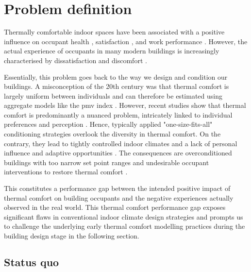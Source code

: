 
\section{Problem definition}
\label{sec:jp-iii-problem-definition}

Thermally comfortable indoor spaces have been associated with a positive influence on occupant health \citep{Altomonte2020}, satisfaction \citep{Frontczak2011, Wagner2007}, and work performance \citep{Wyon2013, Tanabe2015, Porras-Salazar2021}. However, the actual experience of occupants in many modern buildings is increasingly characterised by dissatisfaction and discomfort \citep{Graham2021}. 

Essentially, this problem goes back to the way we design and condition our buildings. A misconception of the 20th century was that thermal comfort is largely uniform between individuals and can therefore be estimated using aggregate models like the \gls{pmv} index \citep{Fanger1972}. However, recent studies show that thermal comfort is predominantly a nuanced problem, intricately linked to individual preferences and perception \citep{KramerFieldstudy2023, Gauthier2020}. Hence, typically applied "one-size-fits-all" conditioning strategies overlook the diversity in thermal comfort. On the contrary, they lead to tightly controlled indoor climates and a lack of personal influence and adaptive opportunities \citep{Humphreys1978, Aguilera2019}. The consequences are overconditioned buildings \citep{Park2018, Parkinson2021, Fukawa2021} with too narrow set point ranges \citep{Hoyt2015, Li2019, Arens2010} and undesirable occupant interventions to restore thermal comfort \citep{Hong2017}. 

This constitutes a performance gap between the intended positive impact of thermal comfort on building occupants and the negative experiences actually observed in the real world. This thermal comfort performance gap exposes significant flaws in conventional indoor climate design strategies and prompts us to challenge the underlying early thermal comfort modelling practices during the building design stage in the following section.



\subsection{Status quo}

